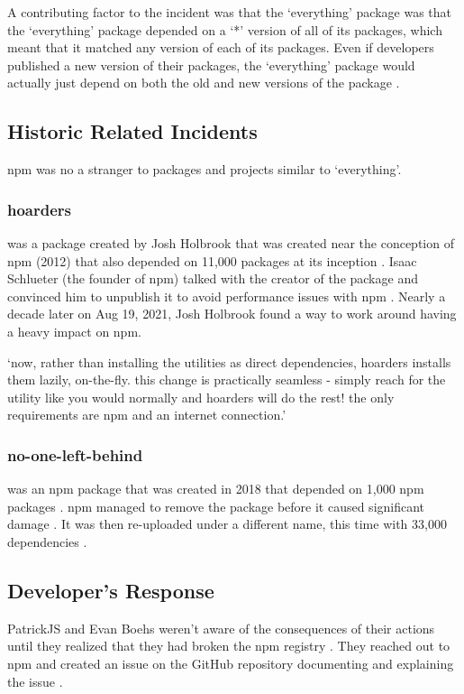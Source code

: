 \documentclass[acmsmall]{acmart}
\begin{document}
A contributing factor to the incident was that the `everything' package was that
the `everything' package depended on a `*' version of all of its packages, which
meant that it matched any version of each of its packages. Even if developers
published a new version of their packages, the `everything' package would
actually just depend on both the old and new versions of the package
\cite{uncenter-blog-everything}.

\subsection{Historic Related Incidents}
npm was no a stranger to packages and projects similar to `everything'.

\subsubsection{hoarders}
was a package created by Josh Holbrook that was created near the conception of
npm (2012) that also depended on 11,000 packages at its inception
\cite{github-hoarders-dependencies}. Isaac Schlueter (the founder of npm) talked
with the creator of the package and convinced him to unpublish it to avoid
performance issues with npm \cite{github-hoarders}.  Nearly a decade later on
Aug 19, 2021, Josh Holbrook found a way to work around having a heavy impact on
npm.

`now, rather than installing the utilities as direct dependencies, hoarders
installs them lazily, on-the-fly. this change is practically seamless - simply
reach for the utility like you would normally and hoarders will do the rest! the
only requirements are npm and an internet connection.' \cite{github-hoarders}

\subsubsection{no-one-left-behind}
was an npm package that was created in 2018 that depended on 1,000 npm packages
\cite{npm-no-one-left-behind-dependencies}. npm managed to remove the package
before it caused significant damage \cite{npm-no-one-left-behind-security}. It
was then re-uploaded under a different name, this time with 33,000 dependencies
\cite{socket-everything}.

\subsection{Developer's Response}
PatrickJS and Evan Boehs weren't aware of the consequences of their actions
until they realized that they had broken the npm registry
\cite{youtube-everything}. They reached out to npm and created an issue on the
GitHub repository documenting and explaining the issue
\cite{bleepingcomputer-everything}.
\end{document}
